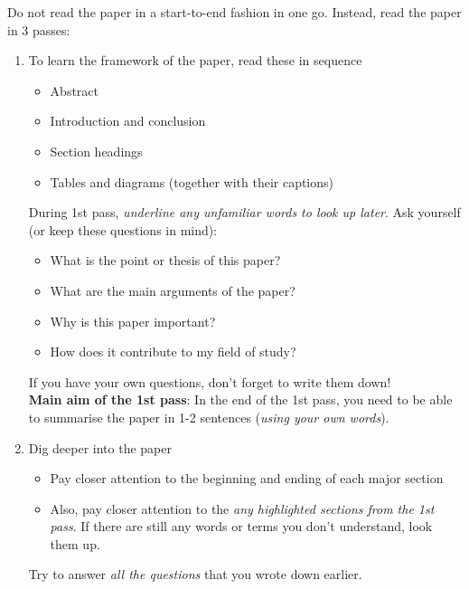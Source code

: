 \documentclass[a4paper]{article}
\begin{document}
Do not read the paper in a start-to-end fashion in one go. Instead, read the paper in 3 passes:
\renewcommand{\labelenumi}{\textbf{Pass \arabic{enumi}}:}
\begin{enumerate}
  \item To learn the framework of the paper, read these in sequence
  \renewcommand{\labelitemi}{$\square$}
  \begin{itemize}
  	\item Abstract
	\item Introduction and conclusion
	\item Section headings
	\item Tables and diagrams (together with their captions)
  \end{itemize}
  
  During 1st pass, \textit{underline any unfamiliar words to look up later}. Ask yourself (or keep these questions in mind):
  \renewcommand{\labelitemi}{\textbullet}
  \begin{itemize}
  	\item What is the point or thesis of this paper?
	\item What are the main arguments of the paper?
	\item Why is this paper important?
	\item How does it contribute to my field of study?
  \end{itemize}
  
  If you have your own questions, don't forget to write them down!\\
 \textbf{ Main aim of the 1st pass}: In the end of the 1st pass, you need to be able to summarise the paper in 1-2 sentences (\textit{using your own words}).
  
  \item Dig deeper into the paper
  \renewcommand{\labelitemi}{$\square$}
  	\begin{itemize}
		\item Pay closer attention to the beginning and ending of each major section
		\item Also, pay closer attention to the \textit{any highlighted sections from the 1st pass}. If there are still any words or terms you don't understand, look them up.
	\end{itemize}
  Try to answer \textit{all the questions} that you wrote down earlier.
  

\end{enumerate}
\end{document}

